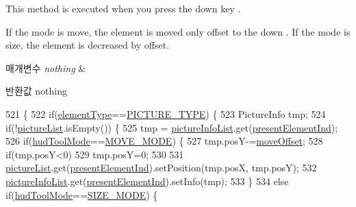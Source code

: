This method is executed when you press the down key . 

If the mode is move, the element is moved only offset to the down . If the mode is size, the element is decreased by offset. 
\begin{DoxyParams}{매개변수}
{\em nothing} & \\
\hline
\end{DoxyParams}
\begin{DoxyReturn}{반환값}
nothing 
\end{DoxyReturn}

\begin{DoxyCode}
521   \{
522     \textcolor{keywordflow}{if}(\hyperlink{classkr_1_1ac_1_1kookmin_1_1cs_1_1tool_1_1_hud_layout_tool_a15ae154367e2b7529894488ef358f004}{elementType}==\hyperlink{classkr_1_1ac_1_1kookmin_1_1cs_1_1tool_1_1_hud_layout_tool_a58687211a1e83d17321e0ee8fc77bd6f}{PICTURE\_TYPE}) \{
523       PictureInfo tmp;
524       \textcolor{keywordflow}{if}(!\hyperlink{classkr_1_1ac_1_1kookmin_1_1cs_1_1tool_1_1_hud_layout_tool_acbd0f26c3534561b74d5f3b75ae4d622}{pictureList}.isEmpty()) \{
525         tmp = \hyperlink{classkr_1_1ac_1_1kookmin_1_1cs_1_1tool_1_1_hud_layout_tool_a8deeda5173478bb396d5eafd48eb5f6f}{pictureInfoList}.get(\hyperlink{classkr_1_1ac_1_1kookmin_1_1cs_1_1tool_1_1_hud_layout_tool_a1611225d44b7a53cd3a3dcf3dc85b784}{presentElementInd});
526         \textcolor{keywordflow}{if}(\hyperlink{classkr_1_1ac_1_1kookmin_1_1cs_1_1tool_1_1_hud_layout_tool_a6fb0515ee80d878c5fd737b9586772b6}{hudToolMode}==\hyperlink{classkr_1_1ac_1_1kookmin_1_1cs_1_1tool_1_1_hud_layout_tool_aecec03baf905df4aaef15cd37abe3abd}{MOVE\_MODE}) \{
527           tmp.posY-=\hyperlink{classkr_1_1ac_1_1kookmin_1_1cs_1_1tool_1_1_hud_layout_tool_a9207f2feb57881dd1d60896e45408aa5}{moveOffset};
528           \textcolor{keywordflow}{if}(tmp.posY<0)
529             tmp.posY=0;
530 
531           \hyperlink{classkr_1_1ac_1_1kookmin_1_1cs_1_1tool_1_1_hud_layout_tool_acbd0f26c3534561b74d5f3b75ae4d622}{pictureList}.get(\hyperlink{classkr_1_1ac_1_1kookmin_1_1cs_1_1tool_1_1_hud_layout_tool_a1611225d44b7a53cd3a3dcf3dc85b784}{presentElementInd}).setPosition(tmp.posX, tmp.posY);
532           \hyperlink{classkr_1_1ac_1_1kookmin_1_1cs_1_1tool_1_1_hud_layout_tool_a8deeda5173478bb396d5eafd48eb5f6f}{pictureInfoList}.get(\hyperlink{classkr_1_1ac_1_1kookmin_1_1cs_1_1tool_1_1_hud_layout_tool_a1611225d44b7a53cd3a3dcf3dc85b784}{presentElementInd}).setInfo(tmp);
533         \}
534         \textcolor{keywordflow}{else} \textcolor{keywordflow}{if}(\hyperlink{classkr_1_1ac_1_1kookmin_1_1cs_1_1tool_1_1_hud_layout_tool_a6fb0515ee80d878c5fd737b9586772b6}{hudToolMode}==\hyperlink{classkr_1_1ac_1_1kookmin_1_1cs_1_1tool_1_1_hud_layout_tool_a7072db948603a28712cb20279dc44a3a}{SIZE\_MODE}) \{

\end{DoxyCode}
